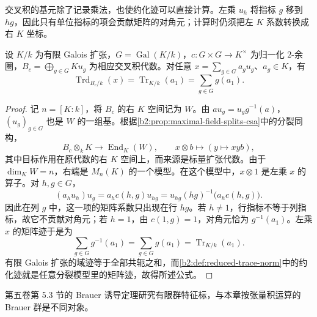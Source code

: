 交叉积的基元除了记录乘法，也使约化迹可以直接计算。左乘 \(u_h\) 将指标 \(g\) 移到 \(hg\)，因此只有单位指标的项会贡献矩阵的对角元；计算时仍须把左 \(K\) 系数转换成右 \(K\) 坐标。

\begin{proposition}\label{b2:prop:crossed-product-reduced-trace}
	设 \(K/k\) 为有限 Galois 扩张，\(G=\operatorname{Gal}(K/k)\)，\(c:G\times G\to K^\times\) 为归一化 \(2\)-余圈，\(B_c=\bigoplus_{g\in G}Ku_g\) 为相应交叉积代数。对任意 \(x=\sum_{g\in G}a_g u_g\)、\(a_g\in K\)，有
	\[
		\operatorname{Trd}_{B_c/k}(x)=\operatorname{Tr}_{K/k}(a_1) =\sum_{g\in G}g(a_1).
	\]
\end{proposition}
\begin{proof}
	记 \(n=[K:k]\)，将 \(B_c\) 的右 \(K\) 空间记为 \(W\)。由 \(a u_g=u_g g^{-1}(a)\)，\((u_g)_{g\in G}\) 也是 \(W\) 的一组基。根据\cref{b2:prop:maximal-field-splits-csa}中的分裂同构，
	\[
		B_c\otimes_k K\longrightarrow \operatorname{End}_K(W),\qquad x\otimes b\longmapsto(y\mapsto xyb),
	\]
	其中目标作用在原代数的右 \(K\) 空间上，而来源是标量扩张代数。由于 \(\dim_KW=n\)，右端是 \(M_n(K)\) 的一个模型。在这个模型中，\(x\otimes1\) 是左乘 \(x\) 的算子。对 \(h,g\in G\)，
	\[
		(a_hu_h)u_g =a_h c(h,g)u_{hg} =u_{hg}(hg)^{-1}\bigl(a_h c(h,g)\bigr).
	\]
	因此在列 \(g\) 中，这一项的矩阵系数只出现在行 \(hg\)。若 \(h\ne1\)，行指标不等于列指标，故它不贡献对角元；若 \(h=1\)，由 \(c(1,g)=1\)，对角元恰为 \(g^{-1}(a_1)\)。左乘 \(x\) 的矩阵迹于是为
	\[
		\sum_{g\in G}g^{-1}(a_1)=\sum_{g\in G}g(a_1) =\operatorname{Tr}_{K/k}(a_1).
	\]
	有限 Galois 扩张的域迹等于全部共轭之和，而\cref{b2:def:reduced-trace-norm}中的约化迹就是任意分裂模型里的矩阵迹，故得所述公式。
\end{proof}

第五卷第 5.3 节的 Brauer 诱导定理研究有限群特征标，与本章按张量积运算的 Brauer 群是不同对象。
